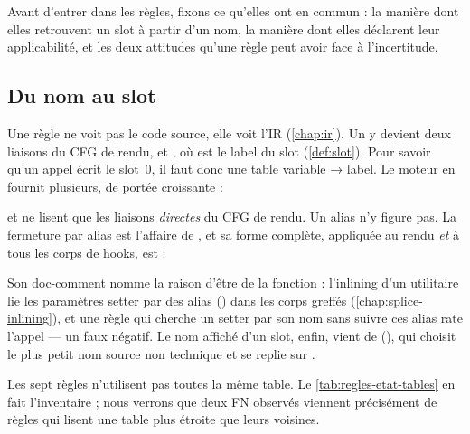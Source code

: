 Avant d'entrer dans les règles, fixons ce qu'elles ont en commun : la manière dont elles retrouvent un slot à partir d'un nom, la manière dont elles déclarent leur applicabilité, et les deux attitudes qu'une règle peut avoir face à l'incertitude.

\subsection{Du nom au slot}

Une règle ne voit pas le code source, elle voit l'IR (\cref{chap:ir}). Un  y devient deux liaisons du CFG de rendu,  et , où  est le label du slot (\cref{def:slot}). Pour savoir qu'un appel  écrit le slot~0, il faut donc une table \og variable → label\fg. Le moteur en fournit plusieurs, de portée croissante :


 et  ne lisent que les liaisons \emph{directes} du CFG de rendu. Un alias  n'y figure pas. La fermeture par alias est l'affaire de , et sa forme complète, appliquée au rendu \emph{et} à tous les corps de hooks, est  :


Son doc-comment nomme la raison d'être de la fonction : l'inlining d'un utilitaire lie les paramètres setter par des alias () dans les corps greffés (\cref{chap:splice-inlining}), et une règle qui cherche un setter par son nom sans suivre ces alias rate l'appel --- un faux négatif. Le nom affiché d'un slot, enfin, vient de  (), qui choisit le plus petit nom source non technique et se replie sur \og {}\fg.

Les sept règles n'utilisent pas toutes la même table. Le \cref{tab:regles-etat-tables} en fait l'inventaire ; nous verrons que deux FN observés viennent précisément de règles qui lisent une table plus étroite que leurs voisines.

